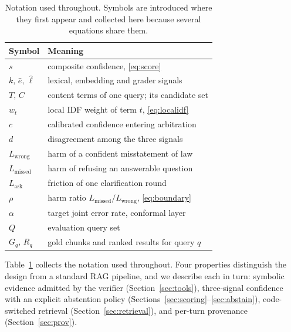 \documentclass[conference]{IEEEtran}
\begin{document}
\begin{table}[t]
\caption{Notation used throughout. Symbols are introduced where they first
appear and collected here because several equations share them.}
\label{tab:notation}
\centering
\small
\begin{tabular}{@{}ll@{}}
\toprule
Symbol & Meaning \\
\midrule
$s$ & composite confidence, \eqref{eq:score} \\
$k,\,\hat{e},\,\hat{\ell}$ & lexical, embedding and grader signals \\
$T,\,C$ & content terms of one query; its candidate set \\
$w_t$ & local IDF weight of term $t$, \eqref{eq:localidf} \\
$c$ & calibrated confidence entering arbitration \\
$d$ & disagreement among the three signals \\
$L_{\text{wrong}}$ & harm of a confident misstatement of law \\
$L_{\text{missed}}$ & harm of refusing an answerable question \\
$L_{\text{ask}}$ & friction of one clarification round \\
$\rho$ & harm ratio $L_{\text{missed}}/L_{\text{wrong}}$, \eqref{eq:boundary} \\
$\alpha$ & target joint error rate, conformal layer \\
$Q$ & evaluation query set \\
$G_q,\,R_q$ & gold chunks and ranked results for query $q$ \\
\bottomrule
\end{tabular}
\end{table}

Table~\ref{tab:notation} collects the notation used throughout. Four
properties distinguish the design from a standard RAG pipeline, and we
describe each in turn: symbolic evidence admitted by the verifier
(Section~\ref{sec:tools}), three-signal confidence with an explicit abstention
policy (Sections~\ref{sec:scoring}--\ref{sec:abstain}), code-switched retrieval
(Section~\ref{sec:retrieval}), and per-turn provenance
(Section~\ref{sec:prov}).
\end{document}
